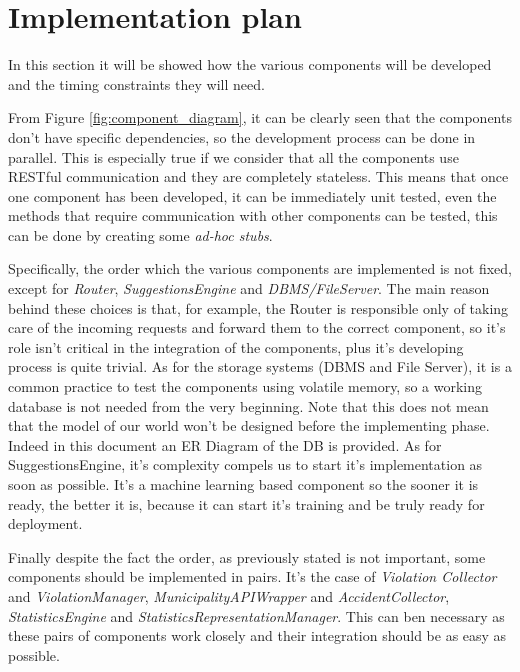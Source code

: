 \section{Implementation plan}
In this section it will be showed how the various components will be developed
and the timing constraints they will need. 

From Figure \ref{fig:component_diagram}, it can be clearly seen that the
components don't have specific dependencies, so the development process can be
done in parallel. This is especially true if we consider that all the components
use RESTful communication and they are completely stateless. This means that
once one component has been developed, it can be immediately unit tested, even
the methods that require communication with other components can be tested, this
can be done by creating some \emph{ad-hoc stubs}.

Specifically, the order which the various components are implemented is not
fixed, except for \emph{Router}, \emph{SuggestionsEngine} and
\emph{DBMS/FileServer}. The main reason behind these choices is that, for
example, the Router is responsible only of taking care of the incoming requests
and forward them to the correct component, so it's role isn't critical in the
integration of the components, plus it's developing process is quite trivial. As
for the storage systems (DBMS and File Server), it is a common practice to test
the components using volatile memory, so a working database is not needed from
the very beginning. Note that this does not mean that the model of our world
won't be designed before the implementing phase. Indeed in this document an ER
Diagram of the DB is provided. As for SuggestionsEngine, it's complexity compels
us to start it's implementation as soon as possible. It's a machine learning
based component so the sooner it is ready, the better it is, because it can
start it's training and be truly ready for deployment.

Finally despite the fact the order, as previously stated is not important, some
components should be implemented in pairs. It's the case of \emph{Violation
Collector} and \emph{ViolationManager}, \emph{MunicipalityAPIWrapper} and
\emph{AccidentCollector}, \emph{StatisticsEngine} and
\emph{StatisticsRepresentationManager}. This can ben necessary as these pairs of
components work closely and their integration should be as easy as possible.